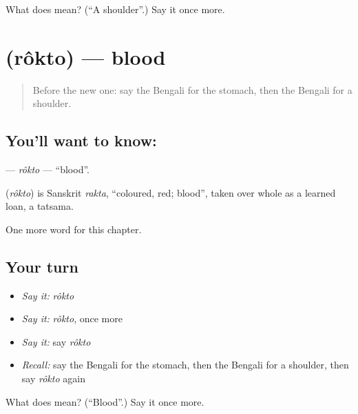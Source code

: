 \begin{tcolorbox}[breakable,colback=teal!4,colframe=teal!35!black,title={Before you move on}]
What does  mean? (\textquotedblleft{}A shoulder\textquotedblright{}.) Say it once more.
\end{tcolorbox}
\section[\texorpdfstring{\bn{রক্ত} (rôkto)}{রক্ত (rôkto)}]{ (rôkto) — blood}

\label{lesson:BN-C43-rokto}



\begin{quote}
Before the new one: say the Bengali for the stomach, then the Bengali for a shoulder.
\end{quote}

\subsection*{You'll want to know: }
\textbf{} — \emph{rôkto} — \textquotedblleft{}blood\textquotedblright{}.

\begin{cousinweb}
\textbf{} (\emph{rôkto}) is Sanskrit \emph{rakta}, \textquotedblleft{}coloured, red; blood\textquotedblright{}, taken over whole as a learned loan, a tatsama.
\end{cousinweb}

\begin{grammarlens}[title={What you've built}]
One more word for this chapter.
\end{grammarlens}

\subsection*{Your turn}
\begin{itemize}
\raggedright
  \item \emph{Say it:} \emph{rôkto}
  \item \emph{Say it:} \emph{rôkto}, once more
  \item \emph{Say it:} say \emph{rôkto}
  \item \emph{Recall:} say the Bengali for the stomach, then the Bengali for a shoulder, then say \emph{rôkto} again
\end{itemize}

\begin{tcolorbox}[breakable,colback=teal!4,colframe=teal!35!black,title={Before you move on}]
What does  mean? (\textquotedblleft{}Blood\textquotedblright{}.) Say it once more.
\end{tcolorbox}

